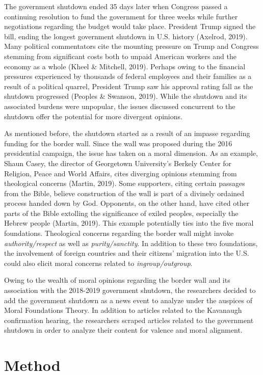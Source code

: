 \documentclass[english,,man]{apa6}
\begin{document}
The government shutdown ended 35 days later when Congress passed a continuing resolution to fund the government for three weeks while further negotiations regarding the budget would take place. President Trump signed the bill, ending the longest government shutdown in U.S. history (Axelrod, 2019). Many political commentators cite the mounting pressure on Trump and Congress stemming from significant costs both to unpaid American workers and the economy as a whole (Kheel \& Mitchell, 2019). Perhaps owing to the financial pressures experienced by thousands of federal employees and their families as a result of a political quarrel, President Trump saw his approval rating fall as the shutdown progressed (Peoples \& Swanson, 2019). While the shutdown and its associated burdens were unpopular, the issues discussed concurrent to the shutdown offer the potential for more divergent opinions.

As mentioned before, the shutdown started as a result of an impasse regarding funding for the border wall. Since the wall was proposed during the 2016 presidential campaign, the issue has taken on a moral dimension. As an example, Shaun Casey, the director of Georgetown University's Berkely Center for Religion, Peace and World Affairs, cites diverging opinions stemming from theological concerns (Martin, 2019). Some supporters, citing certain passages from the Bible, believe construction of the wall is part of a divinely ordained process handed down by God. Opponents, on the other hand, have cited other parts of the Bible extolling the significance of exiled peoples, especially the Hebrew people (Martin, 2019). This example potentially ties into the five moral foundations. Theological concerns regarding the border wall might invoke \emph{authority/respect} as well as \emph{purity/sanctity}. In addition to these two foundations, the involvement of foreign countries and their citizens' migration into the U.S. could also elicit moral concerns related to \emph{ingroup/outgroup}.

Owing to the wealth of moral opinions regarding the border wall and its association with the 2018-2019 government shutdown, the researchers decided to add the government shutdown as a news event to analyze under the auspices of Moral Foundations Theory. In addition to articles related to the Kavanaugh confirmation hearing, the researchers scraped articles related to the government shutdown in order to analyze their content for valence and moral alignment.

\hypertarget{method-1}{%
\section{Method}\label{method-1}}
\end{document}
